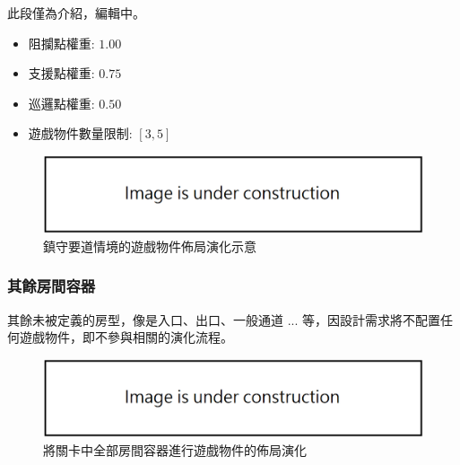 此段僅為介紹，編輯中。

\begin{itemize}
  \setlength\itemsep{-0.5em}
  \item 阻攔點權重: $1.00$
  \item 支援點權重: $0.75$
  \item 巡邏點權重: $0.50$
  \item 遊戲物件數量限制: $[3, 5]$
\end{itemize}

\begin{figure}[ht]
  \begin{center}
    \includegraphics[width=1.0\textwidth]{figures/under_construction.png}
    \caption{鎮守要道情境的遊戲物件佈局演化示意} 
    \label{fig:applied-ga-on-volume-battlepath-trunk}
  \end{center}
\end{figure}

\subsubsection{其餘房間容器}
\label{sssec:method-segments-appliedonvolumes-others}

其餘未被定義的房型，像是入口、出口、一般通道 ... 等，因設計需求將不配置任何遊戲物件，即不參與相關的演化流程。

\begin{figure}[ht]
  \begin{center}
    \includegraphics[width=1.0\textwidth]{figures/under_construction.png}
    \caption{將關卡中全部房間容器進行遊戲物件的佈局演化} 
    \label{fig:applied-ga-on-volume-all}
  \end{center}
\end{figure}
